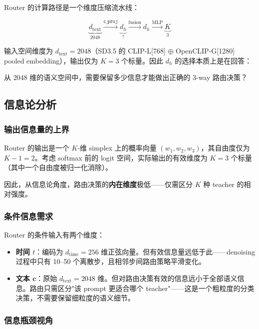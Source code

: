\documentclass[11pt,a4paper]{article}
\begin{document}
Router 的计算路径是一个维度压缩流水线：

\begin{equation}
\underbrace{d_{\text{text}}}_{2048} \xrightarrow{\texttt{c\_proj}} \underbrace{d_h}_{?} \xrightarrow{\text{fusion}} d_h \xrightarrow{\text{MLP}} \underbrace{K}_{3}
\end{equation}

输入空间维度为 $d_{\text{text}} = 2048$（SD3.5 的 CLIP-L[768] $\oplus$ OpenCLIP-G[1280] pooled embedding），输出仅为 $K = 3$ 个标量。因此 $d_h$ 的选择本质上是在回答：

\begin{tcolorbox}[colback=blue!5, colframe=blue!50, title=核心问题]
从 2048 维的语义空间中，需要保留多少信息才能做出正确的 3-way 路由决策？
\end{tcolorbox}

\subsection{信息论分析}

\subsubsection{输出信息量的上界}

Router 的输出是一个 $K$-维 simplex 上的概率向量 $(w_1, w_2, w_3)$，其自由度仅为 $K - 1 = 2$。考虑 softmax 前的 logit 空间，实际输出的有效维度为 $K = 3$ 个标量（其中一个自由度被归一化消除）。

因此，从信息论角度，路由决策的\textbf{内在维度}极低——仅需区分 $K$ 种 teacher 的相对强度。

\subsubsection{条件信息需求}

Router 的条件输入有两个维度：
\begin{itemize}
    \item \textbf{时间 $t$}：编码为 $d_{\text{time}} = 256$ 维正弦向量。但有效信息量远低于此——denoising 过程中只有 10--50 个离散步，且相邻步间路由策略平滑变化。
    \item \textbf{文本 $\mathbf{c}$}：原始 $d_{\text{text}} = 2048$ 维。但对路由决策有效的信息远小于全部语义信息。路由只需区分"该 prompt 更适合哪个 teacher"——这是一个粗粒度的分类决策，不需要保留细粒度的语义细节。
\end{itemize}

\subsubsection{信息瓶颈视角}
\end{document}

